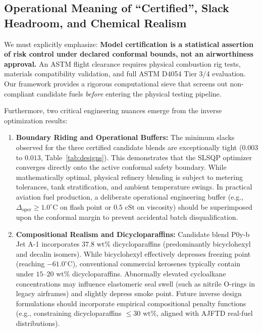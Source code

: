 \documentclass[11pt,a4paper]{article}
\begin{document}
\subsection{Operational Meaning of ``Certified'', Slack Headroom, and Chemical Realism}
We must explicitly emphasize: \textbf{Model certification is a statistical assertion of risk control under declared conformal bounds, not an airworthiness approval.} An ASTM flight clearance requires physical combustion rig tests, materials compatibility validation, and full ASTM D4054 Tier 3/4 evaluation. Our framework provides a rigorous computational sieve that screens out non-compliant candidate fuels \textit{before} entering the physical testing pipeline.

Furthermore, two critical engineering nuances emerge from the inverse optimization results:
\begin{enumerate}
    \item \textbf{Boundary Riding and Operational Buffers:} The minimum slacks observed for the three certified candidate blends are exceptionally tight ($0.003$ to $0.013$, Table~\ref{tab:designs}). This demonstrates that the SLSQP optimizer converges directly onto the active conformal safety boundary. While mathematically optimal, physical refinery blending is subject to metering tolerances, tank stratification, and ambient temperature swings. In practical aviation fuel production, a deliberate operational engineering buffer (e.g., $\Delta_{\text{oper}} \ge 1.0^\circ\text{C}$ on flash point or $0.5\text{ cSt}$ on viscosity) should be superimposed upon the conformal margin to prevent accidental batch disqualification.
    \item \textbf{Compositional Realism and Dicycloparaffins:} Candidate blend P0y-b Jet A-1 incorporates $37.8\text{ wt}\%$ dicycloparaffins (predominantly bicyclohexyl and decalin isomers). While bicyclohexyl effectively depresses freezing point (reaching $-61.0^\circ\text{C}$), conventional commercial kerosenes typically contain under $15\text{--}20\text{ wt}\%$ dicycloparaffins. Abnormally elevated cycloalkane concentrations may influence elastomeric seal swell (such as nitrile O-rings in legacy airframes) and slightly depress smoke point. Future inverse design formulations should incorporate empirical compositional penalty functions (e.g., constraining dicycloparaffins $\le 30\text{ wt}\%$, aligned with AJFTD real-fuel distributions).
\end{enumerate}
\end{document}
